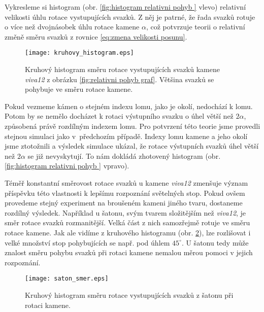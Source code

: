 Vykresleme si histogram (obr. \ref{fig:histogram relativni pohyb } vlevo) relativní velikosti úhlu rotace vystupujících svazků. Z něj je patrné, že řada svazků rotuje o více než dvojnásobek úhlu rotace kamene $\alpha$, což potvrzuje teorii o relativní změně směru svazků z rovnice \ref{eq:zmena velikosti posunu}. 



\begin{figure}[h!]
\begin{center}
\texttt{[image: kruhovy\_histogram.eps]}
\end{center}
\caption[Kruhový histogram směru rotace svazků - \textit{viva12}.]{Kruhový histogram směru rotace vystupujících svazků kamene \textit{viva12} z obrázku \ref{fig:relativni pohyb graf}. Většina svazků se pohybuje ve směru rotace kamene.}
\label{fig:kruhovy histogram}
\end{figure}

Pokud vezmeme kámen o stejném indexu lomu, jako je okolí, nedochází k lomu. Potom by se nemělo docházet k rotaci výstupního svazku o úhel větší než $2\alpha$, způsobená právě rozdílným indexem lomu. Pro potvrzení této teorie jsme provedli stejnou simulaci jako v~předchozím případě. Indexy lomu kamene a jeho okolí jsme ztotožnili a výsledek simulace ukázal, že rotace výstupních svazků úhel větší než $2\alpha$ se již nevyskytují. To nám dokládá zhotovený histogram (obr. \ref{fig:histogram relativni pohyb } vpravo).


Téměř konstantní směrovost rotace svazků u kamene \textit{viva12} zmenšuje význam příspěvku této vlastnosti k lepšímu rozpoznání světelných stop. Pokud ovšem provedeme stejný experiment na broušeném kameni jiného tvaru, dostaneme rozdílný výsledek. Například u šatonu, svým tvarem složitějším než \textit{viva12}, je směr rotace svazků rozmanitější. Velká část z nich samozřejmě rotuje ve směru rotace kamene. Jak ale vidíme z kruhového histogramu (obr. \ref{fig:kruhovy histogram saton}), lze rozlišovat i velké množství stop pohybujících se např. pod úhlem $45^\circ$. U šatonu tedy může znalost směru pohybu svazků při rotaci kamene nemalou měrou pomoci v jejich rozpoznání. 

\begin{figure}
\begin{center}
\texttt{[image: saton\_smer.eps]}
\end{center}
\caption[Kruhový histogram směru rotace svazků - šaton.]{Kruhový histogram směru rotace vystupujících svazků z šatonu při rotaci kamene.}

\label{fig:kruhovy histogram saton}
\end{figure}

  
\clearpage